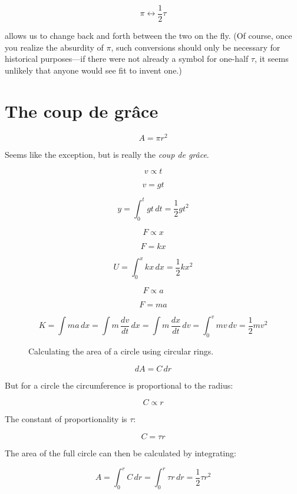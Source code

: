 \documentclass{article}
\begin{document}
\[
  \pi \leftrightarrow \textstyle{\frac{1}{2}}\tau
\]

\noindent allows us to change back and forth between the two on the fly. (Of course, once you realize the absurdity of $\pi$, such conversions should only be necessary for historical purposes---if there were not already a symbol for one-half $\tau$, it seems unlikely that anyone would see fit to invent one.)

\section{The coup de gr\^{a}ce} %
\label{sec:circular_area}

\[ A = \pi r^2 \]


Seems like the exception, but is really the \emph{coup de gr\^{a}ce}.

\[ v \propto t \]

\[ v = g t \]

\[ y = \int_0^t gt\,dt = \textstyle{\frac{1}{2}} gt^2 \]


\[ F \propto x \]

\[ F = k x \]

\[ U = \int_0^x kx\,dx = \textstyle{\frac{1}{2}} kx^2 \]

\[ F \propto a \]

\[ F = m a \]

\[ K = \int ma\,dx = \int m\,\frac{dv}{dt}\,dx = \int m\, \frac{dx}{dt}\,dv = \int_0^v mv\,dv = \textstyle{\frac{1}{2}} mv^2 \]


\begin{figure}
\begin{center}
\end{center}
\caption{Calculating the area of a circle using circular rings.\label{fig:circular-area}}
\end{figure}

\[ dA = C\,dr \]

\noindent But for a circle the circumference is proportional to the radius:

\[ C \propto r \]

\noindent The constant of proportionality is $\tau$:

\[ C = \tau r \]

\noindent The area of the full circle can then be calculated by integrating:

\[ A = \int_0^r C\,dr = \int_0^r \tau r\,dr = \textstyle{\frac{1}{2}} \tau r^2 \]
\end{document}
